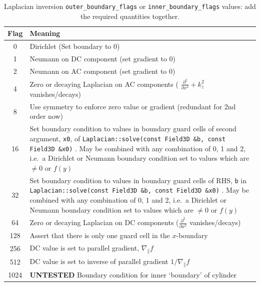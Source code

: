 \documentclass[12pt]{article}
\newcommand{\code}[1]{\texttt{#1}}
\begin{document}
%
\begin{table}
\caption{Laplacian inversion \code{outer\_boundary\_flags} or
\code{inner\_boundary\_flags} values: add the required quantities together.}
%
\label{tab:laplaceBCflags}
%
\centering
%
\begin{tabular}[c]{c|p{14cm}}
\hline
Flag & Meaning \\
 &  Dirichlet (Set boundary to 0) \\
1 &  Neumann on DC component (set gradient to 0) \\
2 &  Neumann on AC component (set gradient to 0) \\
4 &  Zero or decaying Laplacian on AC components ( $\frac{\partial^2}{\partial x^2}+k_z^2$ vanishes/decays)\\
8 & Use symmetry to enforce zero value or gradient (redundant for 2nd order now) \\
16 & Set boundary condition to values in boundary guard cells of second argument, \code{x0}, of
%
\lstinline!Laplacian::solve(const Field3D &b, const Field3D &x0)!
%
.  May be combined with any combination of 0, 1 and 2, i.e.\ a Dirichlet or Neumann boundary condition set to values which are $\neq 0$ or $f(y)$ \\
32 & Set boundary condition to values in boundary guard cells of RHS, \code{b} in
%
\lstinline!Laplacian::solve(const Field3D &b, const Field3D &x0)!
%
.  May be combined with any combination of 0, 1 and 2, i.e.\ a Dirichlet or Neumann boundary condition set to values which are $\neq 0$ or $f(y)$\\
64 & Zero or decaying Laplacian on DC components ($\frac{\partial^2}{\partial x^2}$ vanishes/decays) \\
128 &  Assert that there is only one guard cell in the
$x$-boundary \\
256 &  DC value is set to parallel gradient, $\nabla_\parallel f$ \\
512 &  DC value is set to inverse of parallel gradient $1/\nabla_\parallel f$ \\
1024 & {\color{red} \textbf{UNTESTED}} Boundary condition for inner `boundary'
of cylinder \\
\hline
\end{tabular}
%
\end{table}
%
\end{document}
